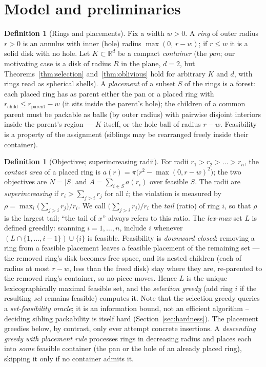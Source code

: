 \documentclass[11pt]{article}
\theoremstyle{definition}
\newtheorem{definition}[theorem]{Definition}
\newcommand{\R}{\mathbb{R}}
\begin{document}
\section{Model and preliminaries}\label{sec:model}

\begin{definition}[Rings and placements]
Fix a width $w>0$. A \emph{ring} of outer radius $r>0$ is an annulus with
inner (hole) radius $\max(0,\,r-w)$; if $r\le w$ it is a solid disk with no
hole. Let $K\subset\R^d$ be a compact \emph{container} (the \emph{pan}; our
motivating case is a disk of radius $R$ in the plane, $d=2$, but
Theorems~\ref{thm:selection} and~\ref{thm:oblivious} hold for arbitrary $K$ and
$d$, with rings read as spherical shells). A \emph{placement} of a subset $S$
of the rings is a forest: each placed ring has as parent either the pan or a
placed ring with $r_{\mathrm{child}}\le r_{\mathrm{parent}}-w$ (it sits inside
the parent's hole); the children of a common parent must be packable as
balls (by outer radius) with pairwise disjoint interiors inside the parent's region --- $K$
itself, or the hole ball of radius $r-w$. Feasibility is a property of the
assignment (siblings may be rearranged freely inside their container).
\end{definition}

\begin{definition}[Objectives; superincreasing radii]
For radii $r_1>r_2>\dots>r_n$, the \emph{contact area} of a placed ring is
$a(r)=\pi\bigl(r^2-\max(0,r-w)^2\bigr)$; the two objectives are
$N=|S|$ and $A=\sum_{i\in S}a(r_i)$ over feasible $S$. The radii are
\emph{superincreasing} if $r_i>\sum_{j>i}r_j$ for all $i$; the violation is
measured by $\rho=\max_i\bigl(\sum_{j>i}r_j\bigr)/r_i$.
We call $\bigl(\sum_{j>i}r_j\bigr)/r_i$ the \emph{tail} (ratio) of ring
$i$, so that $\rho$ is the largest tail; ``the tail of $x$'' always
refers to this ratio.
The \emph{lex-max} set $L$ is defined greedily: scanning $i=1,\dots,n$,
include $i$ whenever $(L\cap\{1,\dots,i-1\})\cup\{i\}$ is feasible.
Feasibility is \emph{downward closed}: removing a ring from a feasible
placement leaves a feasible placement of the remaining set --- the
removed ring's disk becomes free space, and its nested children (each
of radius at most $r-w$, less than the freed disk) stay where
they are, re-parented to the removed ring's container, so no piece
moves. Hence $L$ is the unique lexicographically
maximal feasible set, and the \emph{selection greedy} (add ring $i$ if the
resulting \emph{set} remains feasible) computes it. Note that the selection
greedy queries a \emph{set-feasibility oracle}; it is an information bound,
not an efficient algorithm -- deciding sibling packability is itself hard
(Section~\ref{sec:hardness}). The placement greedies below, by contrast,
only ever attempt concrete insertions.
A \emph{descending greedy with placement rule} processes rings in decreasing
radius and places each into \emph{some} feasible container (the pan or the hole
of an already placed ring), skipping it only if no container admits it.
\end{definition}
\end{document}
